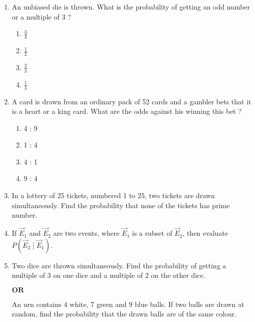 \documentclass{article}
\begin{document}
\begin{enumerate}
    \item An unbiased die is thrown. What is the probability of getting an odd number or a multiple of 3 ?\begin{enumerate}
        \item $\frac{3}{4}$
        \item $\frac{1}{2}$
        \item $\frac{2}{3}$
        \item $\frac{1}{3}$
    \end{enumerate}
    \item A card is drawn from an ordinary pack of 52 cards and a gambler bets that it 
is a heart or a king card. What are the odds against his winning this bet ?
\begin{enumerate}
    \item 4 : 9
    \item 1 : 4
    \item 4 : 1
    \item 9 : 4
\end{enumerate}
\item In a lottery of 25 tickets, numbered 1 to 25, two tickets are drawn simultaneously. Find the probability that none of the tickets has prime number.
\item If $\Vec{E}_1$ and $\Vec{E}_2$ are two events, where $\Vec{E}_1$ is a subset of $\Vec{E}_2$, then evaluate $P(\Vec{E}_2 \mid \Vec{E}_1)$.\\
\item Two dice are thrown simultaneously. Find the probability of getting a multiple of 3 on one dice and a multiple of 2 on the other dice.
\begin{center}
        $\textbf{OR}$
\end{center}
 An urn contains 4 white, 7 green and 9 blue balls. If two balls are drawn at random, find the probability that the drawn balls are of the same colour. 
\end{enumerate}
\end{document}
